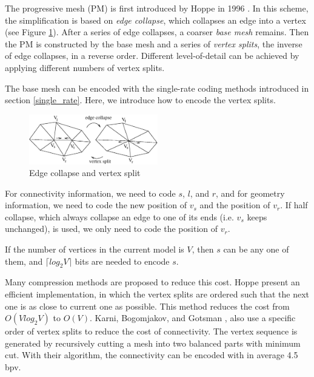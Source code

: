    The progressive mesh (PM) \label{progressive_mesh}is first
    introduced by Hoppe in 1996 \cite{hoppe96progressive}. In this
    scheme, the simplification is based on \emph{edge collapse}, which
    collapses an edge into a vertex (see Figure \ref{split2}).
    After a series of edge collapses, a coarser \emph{base mesh} remains. 
    Then the PM is constructed by the base mesh and a series of \emph{vertex
    splits}, the inverse of edge collapses, in a reverse order.
    Different level-of-detail can be achieved by applying different numbers
    of vertex splits.

    The base mesh can be encoded with the single-rate coding methods
    introduced in section \ref{single_rate}. Here, we introduce
    how to encode the vertex splits. 
\begin{figure}
\centering
\includegraphics[width=0.5\textwidth]{split2.eps}
\caption{Edge collapse and vertex split}\label{split2}
\end{figure}
    For connectivity
    information, we need to code $s$, $l$, and $r$, and for geometry
    information, we need to code the new position of $v_{s}$ and the
    position of $v_{r}$. If half collapse, which always collapse an
    edge to one of its ends (i.e. $v_{s}$ keeps unchanged), is used, 
    we only need to code the position of $v_r$. 
    
    If the number of vertices in the current model is
    $V$, then $s$ can be any one of them, 
    and ${\lceil}log_{2}V{\rceil}$ bits are needed to encode $s$. 
    
    Many compression methods are proposed to reduce this cost.
    Hoppe \cite{efficient:hoppe} present an efficient implementation,
    in which the vertex splits are ordered such that the next one
    is as close to current one as possible. This method reduces the cost
    from $O(Vlog_{2}V)$ to $O(V)$.
    Karni, Bogomjakov, and Gotsman \cite{602153}, 
    also use a specific order of vertex splits to reduce the cost of connectivity. 
    The vertex sequence is generated by recursively cutting a mesh into two
    balanced parts with minimum cut. With their algorithm, the connectivity can
    be encoded with in average 4.5 bpv. 

